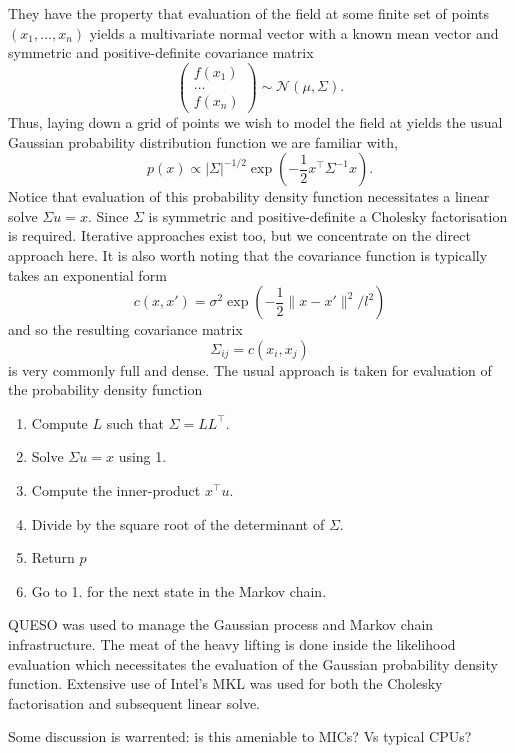 They have the property that evaluation of the field at some finite set of
points $(x_1, \ldots, x_n)$ yields a multivariate normal vector with a known
mean vector and symmetric and positive-definite covariance matrix
\begin{equation}
  \begin{pmatrix}
    f(x_1) \\
    \hdots \\
    f(x_n)
  \end{pmatrix}
  \sim \mathcal{N}(\mu, \Sigma).
\end{equation}
Thus, laying down a grid of points we wish to model the field at yields the
usual Gaussian probability distribution function we are familiar with,
\begin{equation}
  p(x) \propto |\Sigma|^{-1/2} \exp(-\frac12 x^\top \Sigma^{-1} x).
\end{equation}
Notice that evaluation of this probability density function necessitates a
linear solve $\Sigma u = x$.  Since $\Sigma$ is symmetric and positive-definite
a Cholesky factorisation is required.  Iterative approaches exist too, but we
concentrate on the direct approach here.  It is also worth noting that the
covariance function is typically takes an exponential form
\begin{equation}
  c(x, x') = \sigma^2 \exp(-\frac12 \| x - x' \|^2 / l^2)
\end{equation}
and so the resulting covariance matrix
\begin{equation}
  \Sigma_{ij} = c(x_i, x_j)
\end{equation}
is very commonly full and dense.  The usual approach is taken for evaluation
of the probability density function
\begin{enumerate}
  \item Compute $L$ such that $\Sigma = LL^\top$.
  \item Solve $\Sigma u = x$ using 1.
  \item Compute the inner-product $x^\top u$.
  \item Divide by the square root of the determinant of $\Sigma$.
  \item Return $p$
  \item Go to 1. for the next state in the Markov chain.
\end{enumerate}

QUESO was used to manage the Gaussian process and Markov chain infrastructure.
The meat of the heavy lifting is done inside the likelihood evaluation which
necessitates the evaluation of the Gaussian probability density function.
Extensive use of Intel's MKL was used for both the Cholesky factorisation and
subsequent linear solve.


Some discussion is warrented: is this ameniable to MICs? Vs typical CPUs?
